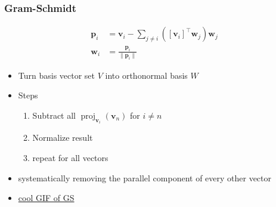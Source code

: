 \documentclass[aspectratio=169]{beamer}
\newcommand{\tpose}[1]{\left[#1\right]^{\! \top} \!\!}
\begin{document}
\begin{frame}
    \frametitle{Gram-Schmidt}

    \begin{align}
        \bm{p}_i &= \bm{v}_i - \sum_{j \neq i} (\tpose{\bm{v}_i} \bm{w}_j) \bm{w}_j \\
        \bm{w}_i &= \frac{\bm{p}_i}{\|\bm{p}_i\|}
    \end{align}

    \begin{itemize}
        \item Turn basis vector set \(V\) into orthonormal basis \(W\)
        \item Steps
        \begin{enumerate}
            \item Subtract all \(\operatorname{proj}_{\bm{v}_i}(\bm{v}_n)\) for \(i \neq n\)
            \item Normalize result
            \item repeat for all vectors
        \end{enumerate}
        \item systematically removing the parallel component of every other vector
        \item \href{https://upload.wikimedia.org/wikipedia/commons/e/ee/Gram-Schmidt_orthonormalization_process.gif}{cool GIF of GS}
    \end{itemize}
\end{frame}
\end{document}
